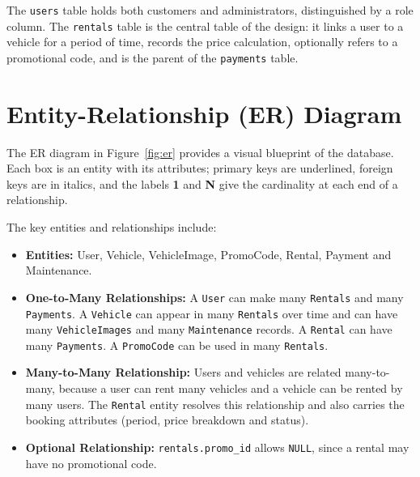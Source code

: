 \documentclass[10pt,a4paper]{report}
\newcommand{\col}[1]{\texttt{#1}}
\begin{document}
The \col{users} table holds both customers and administrators, distinguished by a role column. The \col{rentals} table is the central table of the design: it links a user to a vehicle for a period of time, records the price calculation, optionally refers to a promotional code, and is the parent of the \col{payments} table.

\section{Entity-Relationship (ER) Diagram}
The ER diagram in Figure~\ref{fig:er} provides a visual blueprint of the database. Each box is an entity with its attributes; primary keys are underlined, foreign keys are in italics, and the labels \textbf{1} and \textbf{N} give the cardinality at each end of a relationship.

The key entities and relationships include:
\begin{itemize}
  \item \textbf{Entities:} User, Vehicle, VehicleImage, PromoCode, Rental, Payment and Maintenance.
  \item \textbf{One-to-Many Relationships:} A \col{User} can make many \col{Rentals} and many \col{Payments}. A \col{Vehicle} can appear in many \col{Rentals} over time and can have many \col{VehicleImages} and many \col{Maintenance} records. A \col{Rental} can have many \col{Payments}. A \col{PromoCode} can be used in many \col{Rentals}.
  \item \textbf{Many-to-Many Relationship:} Users and vehicles are related many-to-many, because a user can rent many vehicles and a vehicle can be rented by many users. The \col{Rental} entity resolves this relationship and also carries the booking attributes (period, price breakdown and status).
  \item \textbf{Optional Relationship:} \col{rentals.promo_id} allows \col{NULL}, since a rental may have no promotional code.
\end{itemize}
\end{document}
